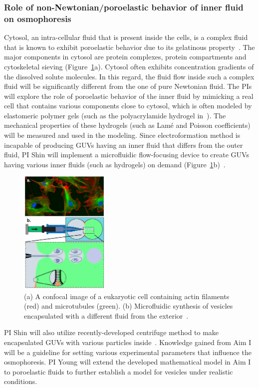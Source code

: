 \documentclass[11pt]{article}
\begin{document}
\subsubsection{Role of non-Newtonian/poroelastic behavior of inner fluid on osmophoresis \label{subsubsec:Role_Non-Newtonian_Behavior}}
Cytosol, an intra-cellular fluid that is present inside the cells, is a
complex fluid that is known to exhibit poroelastic behavior due to its
gelatinous property~\cite{zhou2013,moeendarbary2013}. The major
components in cytosol are protein complexes, protein compartments and
cytoskeletal sieving (Figure~\ref{fig:ConfocalImage}a).  Cytosol often
exhibits concentration gradients of the dissolved solute molecules.  In
this regard, the fluid flow inside such a complex fluid will be
significantly different from the one of pure Newtonian fluid. The PIs
will explore the role of poroelastic behavior of the inner fluid by
mimicking a real cell that contains various components close to cytosol,
which is often modeled by elastomeric polymer gels (such as the
polyacrylamide hydrogel in~\cite{MacMinn2016_PRApplied,
Bertrand2016_PRApplied}).  The mechanical properties of these hydrogels
(such as Lam\'e and Poisson coefficients) will be measured and used in
the modeling. Since electroformation method is incapable of producing
GUVs having an inner fluid that differs from the outer fluid, PI Shin
will implement a microfluidic flow-focusing device to create GUVs having
various inner fluids (such as hydrogels) on demand
(Figure~\ref{fig:ConfocalImage}b)~\cite{stachowiak2008}. 
\begin{figure}
\vspace*{-7pt}
\centerline{\includegraphics[width=1.7in]{figs/ConfocalImage.pdf}}
\vspace*{-8pt}
\caption{\label{fig:ConfocalImage} (a) A confocal image of a eukaryotic
  cell containing actin filaments (red) and microtubules (green).  (b)
  Microfluidic synthesis of vesicles encapsulated with a different fluid
  from the exterior~\cite{stachowiak2008}.}
\end{figure}
%
PI Shin  will also utilize recently-developed centrifuge method to make
encapsulated GUVs with various particles inside~\cite{natsume2017}.
Knowledge gained from Aim I will be a guideline for setting various
experimental parameters that influence the osmophoresis. PI Young  will
extend the developed mathematical model in Aim I to poroelastic fluids
to further establish a model for vesicles under realistic conditions.
\end{document}
